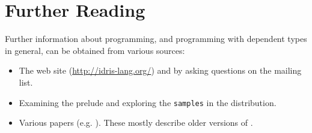 \section{Further Reading}

Further information about \Idris{} programming, and programming with dependent
types in general, can be obtained from various sources:

\begin{itemize}
\item The \Idris{} web site (\url{http://idris-lang.org/}) and by asking questions
on the mailing list.
\item Examining the prelude and exploring the \texttt{samples} in the distribution.
\item Various papers (e.g. \cite{plpv11, scrap-engine,res-dsl-padl12}). These mostly describe
older versions of \Idris{}.
\end{itemize}

